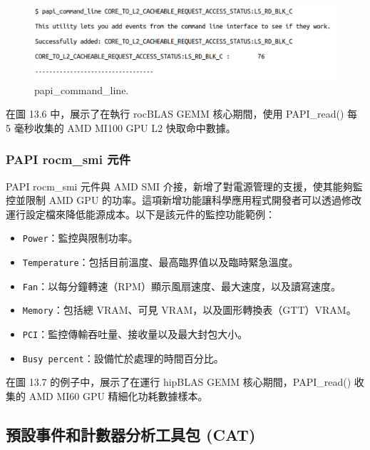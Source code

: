\begin{figure}
    \centering
    \includegraphics[width=0.9\linewidth]{FileAusiliari/Screenshots/Figure13-5.png}
    \caption{papi\_command\_line.}
    \label{fig:PAPI5}
\end{figure}

在圖 13.6 中，展示了在執行 rocBLAS GEMM 核心期間，使用 PAPI\_read() 每 5 毫秒收集的 AMD MI100 GPU L2 快取命中數據。

\subsubsection{PAPI rocm\_smi 元件}

PAPI rocm\_smi 元件與 AMD SMI 介接，新增了對電源管理的支援，使其能夠監控並限制 AMD GPU 的功率。這項新增功能讓科學應用程式開發者可以透過修改運行設定檔來降低能源成本。以下是該元件的監控功能範例：

\begin{itemize}
    \item \texttt{Power}：監控與限制功率。
    \item \texttt{Temperature}：包括目前溫度、最高臨界值以及臨時緊急溫度。
    \item \texttt{Fan}：以每分鐘轉速（RPM）顯示風扇速度、最大速度，以及讀寫速度。
    \item \texttt{Memory}：包括總 VRAM、可見 VRAM，以及圖形轉換表（GTT）VRAM。
    \item \texttt{PCI}：監控傳輸吞吐量、接收量以及最大封包大小。
    \item \texttt{Busy percent}：設備忙於處理的時間百分比。
\end{itemize}

在圖 13.7 的例子中，展示了在運行 hipBLAS GEMM 核心期間，PAPI\_read() 收集的 AMD MI60 GPU 精細化功耗數據樣本。

\subsection{預設事件和計數器分析工具包 (CAT)}

